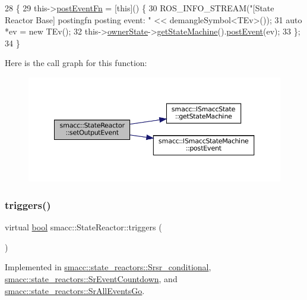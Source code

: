 \begin{DoxyCode}
28 \{
29     this->\hyperlink{classsmacc_1_1StateReactor_a1d97ae5c1689b6716c60c19c94a7eeae}{postEventFn} = [\textcolor{keyword}{this}]() \{
30         ROS\_INFO\_STREAM(\textcolor{stringliteral}{"[State Reactor Base] postingfn posting event: "} << demangleSymbol<TEv>());
31         \textcolor{keyword}{auto} *ev = \textcolor{keyword}{new} TEv();
32         this->\hyperlink{classsmacc_1_1StateReactor_aabd30af9412a8fea9ec5906f173d9d4a}{ownerState}->\hyperlink{classsmacc_1_1ISmaccState_a562bb3f9a3ac16b8be71e4794c9e7523}{getStateMachine}().\hyperlink{classsmacc_1_1ISmaccStateMachine_ad80cdd7bbc9a9f3b221c625754fed1ed}{postEvent}(ev);
33     \};
34 \}
\end{DoxyCode}
Here is the call graph for this function\+:
\nopagebreak
\begin{figure}[H]
\begin{center}
\leavevmode
\includegraphics[width=350pt]{classsmacc_1_1StateReactor_ae9d0dd0c8cdcc57f8881f0962040c8ed_cgraph}
\end{center}
\end{figure}
\mbox{\label{classsmacc_1_1StateReactor_a445bc3c90980d75d7d815b85cfb68b21}} 
\subsubsection{\texorpdfstring{triggers()}{triggers()}}
{\footnotesize\ttfamily virtual \hyperlink{classbool}{bool} smacc\+::\+State\+Reactor\+::triggers (\begin{DoxyParamCaption}{ }\end{DoxyParamCaption})\hspace{0.3cm}{\ttfamily [pure virtual]}}



Implemented in \hyperlink{classsmacc_1_1state__reactors_1_1Srsr__conditional_aa95877afb569902015924e5e7d1da35a}{smacc\+::state\+\_\+reactors\+::\+Srsr\+\_\+conditional}, \hyperlink{classsmacc_1_1state__reactors_1_1SrEventCountdown_aff678113dbd07339e5e3736e4aa00c81}{smacc\+::state\+\_\+reactors\+::\+Sr\+Event\+Countdown}, and \hyperlink{classsmacc_1_1state__reactors_1_1SrAllEventsGo_ab752043eda070661d2a676b580c679b7}{smacc\+::state\+\_\+reactors\+::\+Sr\+All\+Events\+Go}.



